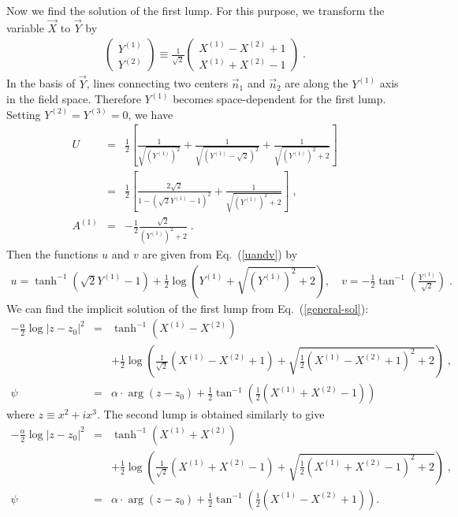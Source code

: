 \documentclass[a4paper,12pt]{article}
\begin{document}
Now we find the solution of the first lump. 
For this purpose, we transform
the variable $\vec{X}$ to $\vec{Y}$ by  
\begin{eqnarray}
  \left(
  \begin{array}{c}
    Y^{(1)} \\
    Y^{(2)}
  \end{array}
  \right) \equiv \frac{1}{\sqrt{2}}
  \left(
  \begin{array}{c}
    X^{(1)}-X^{(2)}+1 \\
    X^{(1)}+X^{(2)}-1
  \end{array} 
  \right) \;. 
\end{eqnarray} 
In the basis of $\vec{Y}$, lines connecting two centers $\vec{n}_1$ and 
$\vec{n}_2$ are along the $Y^{(1)}$ axis in the field space. 
Therefore $Y^{(1)}$ becomes 
space-dependent for the first lump. 
Setting $Y^{(2)}=Y^{(3)}=0$, we have 
\begin{eqnarray}
  U &=& \frac{1}{2}\left[ \frac{1}{\sqrt{(Y^{(1)})^2}} 
         + \frac{1}{\sqrt{(Y^{(1)}-\sqrt{2})^2}} 
         +\frac{1}{\sqrt{(Y^{(1)})^2+2}} \right] \nonumber \\
    &=&  \frac{1}{2}\left[ \frac{2\sqrt{2}}{1-(\sqrt{2}Y^{(1)}-1)^2} 
         + \frac{1}{\sqrt{(Y^{(1)})^2+2}} \right] \;, \nonumber \\ 
  A^{(1)} &=& -\frac{1}{2}\frac{\sqrt{2}}{(Y^{(1)})^2+2} \;.  
\end{eqnarray}
Then the functions $u$ and $v$ are given from Eq.~(\ref{uandv}) by 
\begin{eqnarray}
  u = \tanh ^{-1}(\sqrt{2}Y^{(1)}-1)+\frac{1}{2}\log (Y^{(1)}
          +\sqrt{(Y^{(1)})^2+2}),   \quad 
  v = -\frac{1}{2} \tan ^{-1}
      \left( \frac{Y^{(1)}}{\sqrt{2}} \right) \;. 
\end{eqnarray}
We can find the implicit solution of the first lump 
from Eq.~(\ref{general-sol}):
\begin{eqnarray}
  -\frac{\alpha}{2}\log |z-z_0|^2 &=& 
    \tanh ^{-1}(X^{(1)}-X^{(2)}) \nonumber \\
    &{}& + \frac{1}{2}\log \left(
          \frac{1}{\sqrt{2}}(X^{(1)}-X^{(2)}+1)
          +\sqrt{\frac{1}{2}(X^{(1)}-X^{(2)}+1)^2+2}
          \right) \;, \nonumber \\
  \psi &=& \alpha\cdot \arg (z-z_0) +\frac{1}{2}\tan ^{-1}\left(  
    \frac{1}{2}(X^{(1)}+X^{(2)}-1)
    \right) 
    \label{lump-1st}
\end{eqnarray}
where $z\equiv x^2+ix^3$. 
The second lump is obtained similarly to give 
\begin{eqnarray}
  -\frac{\alpha}{2}\log |z-z_0|^2 &=& 
    \tanh ^{-1}(X^{(1)}+X^{(2)}) \nonumber \\
    &{}& + \frac{1}{2}\log \left(
         \frac{1}{\sqrt{2}}(X^{(1)}+X^{(2)}-1)
         +\sqrt{\frac{1}{2}(X^{(1)}+X^{(2)}-1)^2+2}
         \right) \;, \nonumber \\
  \psi &=& \alpha\cdot \arg (z-z_0) +\frac{1}{2}\tan ^{-1}\left(  
    \frac{1}{2}(X^{(1)}-X^{(2)}+1)
    \right) .
\label{lump-2nd} 
\end{eqnarray}
\end{document}
